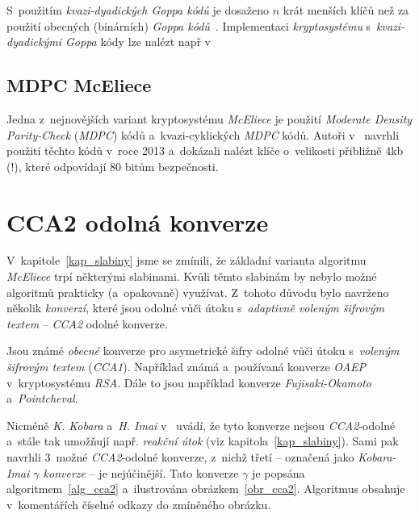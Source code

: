 \documentclass[thesis=M,czech,hidelinks]{FITthesis}[2012/06/26]
\newcommand{\0}{{\textcolor[gray]{0.75}{0}}}
\begin{document}
S~použitím \emph{kvazi-dyadických Goppa kódů} je dosaženo $n$ krát menších klíčů
než za použití obecných (binárních) \emph{Goppa kódů}~\cite{Misoczki1}.
Implementaci \emph{kryptosystému} s~\emph{kvazi-dyadickými Goppa} kódy lze
nalézt např v~\cite{Paustjan,Kratochvil}


\subsection{MDPC McEliece}\label{kap_MDPC}

Jedna z~nejnovějších variant kryptosystému \emph{McEliece} je použití
\emph{Moderate Density Parity-Check} (\emph{MDPC}) kódů a~kvazi-cyklických
\emph{MDPC} kódů.  Autoři v~\cite{Misoczki2} navrhli použití těchto kódů v~roce
2013 a~dokázali nalézt klíče o~velikosti přibližně $4$\;kb (!), které odpovídají
$80$ bitům bezpečnosti.



\section{CCA2 odolná konverze}\label{kap_cca2}

V~kapitole~\ref{kap_slabiny} jsme se zmínili, že základní varianta algoritmu
\emph{McEliece} trpí některými slabinami. Kvůli těmto slabinám by nebylo možné
algoritmů prakticky (a~opakovaně) využívat. Z~tohoto důvodu bylo navrženo
několik \emph{konverzí}, které jsou odolné vůči útoku s~\emph{adaptivně voleným
šifrovým textem} -- \emph{CCA2} odolné konverze.

Jsou známé \emph{obecné} konverze pro asymetrické šifry odolné vůči útoku
s~\emph{voleným šifrovým textem} (\emph{CCA1}). Například známá a~používaná
konverze \emph{OAEP} v~kryptosystému \emph{RSA}. Dále to jsou například konverze
\emph{Fujisaki-Okamoto} a~\emph{Pointcheval}.

Nicméně \emph{K. Kobara} a~\emph{H. Imai} v~\cite{Kobara} uvádí, že tyto
konverze nejsou \emph{CCA2}-odolné a~stále tak umožňují např. \emph{reakční
útok} (viz kapitola~\ref{kap_slabiny}). Sami pak navrhli 3~možné
\emph{CCA2}-odolné konverze, z~nichž třetí -- označená jako \emph{Kobara-Imai
$\gamma$ konverze} -- je nejúčinější. Tato konverze $\gamma$ je popsána
algoritmem~\ref{alg_cca2} a~ilustrována obrázkem~\ref{obr_cca2}. Algoritmus
obsahuje v~komentářích číselné odkazy do zmíněného obrázku.
\end{document}
